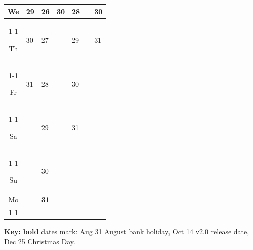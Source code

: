 \documentclass[a4paper]{article}
\newcommand{\datestrut}{\rule{0pt}{12pt}}
\begin{document}
\begin{center}
\begin{tabular}{|c||p{2.5cm}|p{2.5cm}|p{2.5cm}|p{2.5cm}|p{2.5cm}|p{2.5cm}|}
\datestrut We & 29 & 26 & 30 & 28 &  & 30 \\
\cline{1-1}\cline{2-2}\cline{3-3}\cline{4-4}\cline{5-5}\cline{7-7}
\datestrut Th & 30 & 27 &  & 29 &  & 31 \\
\cline{1-1}\cline{2-2}\cline{3-3}\cline{5-5}\cline{7-7}
\datestrut Fr & 31 & 28 &  & 30 &  &  \\
\cline{1-1}\cline{2-2}\cline{3-3}\cline{5-5}
\datestrut Sa &  & 29 &  & 31 &  &  \\
\cline{1-1}\cline{3-3}\cline{5-5}
\datestrut Su &  & 30 &  &  &  &  \\
\hline\hline
\datestrut Mo &  & \textbf{31} &  &  &  &  \\
\cline{1-1}\cline{3-3}
\hline
\end{tabular}
\end{center}

\vspace{1em}
\noindent\textbf{Key:} \textbf{bold} dates mark: Aug 31 August bank holiday,
Oct 14 v2.0 release date, Dec 25 Christmas Day.
\end{document}
